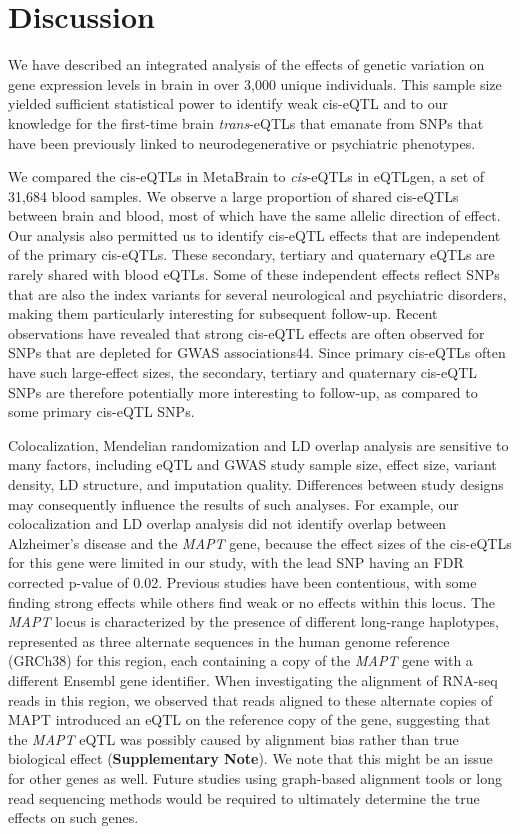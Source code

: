 {{\section{Discussion}

We have described an integrated analysis of the effects of genetic variation on gene expression levels in brain in over 3,000 unique individuals. This sample size yielded sufficient statistical power to identify weak cis-eQTL and to our knowledge for the first-time brain \emph{trans}-eQTLs that emanate from SNPs that have been previously linked to neurodegenerative or psychiatric phenotypes. 

We compared the cis-eQTLs in MetaBrain to \emph{cis}-eQTLs in eQTLgen, a set of 31,684 blood samples. We observe a large proportion of shared cis-eQTLs between brain and blood, most of which have the same allelic direction of effect. Our analysis also permitted us to identify cis-eQTL effects that are independent of the primary cis-eQTLs. These secondary, tertiary and quaternary eQTLs are rarely shared with blood eQTLs. Some of these independent effects reflect SNPs that are also the index variants for several neurological and psychiatric disorders, making them particularly interesting for subsequent follow-up. Recent observations have revealed that strong cis-eQTL effects are often observed for SNPs that are depleted for GWAS associations44. Since primary cis-eQTLs often have such large-effect sizes, the secondary, tertiary and quaternary cis-eQTL SNPs are therefore potentially more interesting to follow-up, as compared to some primary cis-eQTL SNPs. 

Colocalization, Mendelian randomization and LD overlap analysis are sensitive to many factors, including eQTL and GWAS study sample size, effect size, variant density, LD structure, and imputation quality. Differences between study designs may consequently influence the results of such analyses. For example, our colocalization and LD overlap analysis did not identify overlap between Alzheimer’s disease and the \emph{MAPT} gene, because the effect sizes of the cis-eQTLs for this gene were limited in our study, with the lead SNP having an FDR corrected p-value of 0.02. Previous studies have been contentious, with some finding strong effects\cite{wangComprehensiveFunctionalGenomic2018,ngXQTLMapIntegrates2017} while others find weak or no effects within this locus\cite{aguetGeneticEffectsGene2017,siebertsLargeEQTLMetaanalysis2020}. The \emph{MAPT} locus is characterized by the presence of different long-range haplotypes, represented as three alternate sequences in the human genome reference (GRCh38) for this region, each containing a copy of the \emph{MAPT} gene with a different Ensembl gene identifier. When investigating the alignment of RNA-seq reads in this region, we observed that reads aligned to these alternate copies of MAPT introduced an eQTL on the reference copy of the gene, suggesting that the \emph{MAPT} eQTL was possibly caused by alignment bias rather than true biological effect (\textbf{Supplementary Note}). We note that this might be an issue for other genes as well. Future studies using graph-based alignment tools or long read sequencing methods would be required to ultimately determine the true effects on such genes. 

}}
